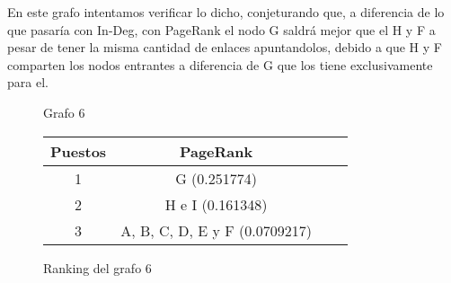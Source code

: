 En este grafo intentamos verificar lo dicho, conjeturando que, a diferencia de lo que pasaría con In-Deg, con PageRank el nodo G saldrá mejor que el H y F a pesar de tener la misma cantidad de enlaces apuntandolos, debido a que H y F comparten los nodos entrantes a diferencia de G que los tiene exclusivamente para el.
\begin{figure}[H]
\centering
{}
  \caption{\footnotesize{ Grafo 6 }}
  \label{fig:Rankings}
\end{figure}

\begin{figure}[H]
\centering
\begin{tabular}{| c | c | c | c |}
  \hline
  Puestos & PageRank\\ \hline \hline
  1 & G (0.251774)\\ \hline
  2 & H e I (0.161348)\\ \hline
  3 & A, B, C, D, E y F (0.0709217)\\ \hline
\end{tabular}
  \caption{\footnotesize{Ranking del grafo 6}}
  \label{fig:Rankings}
\end{figure}

